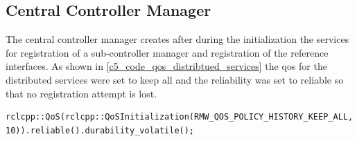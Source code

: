 \subsection{Central Controller Manager}
The central controller manager creates after during the initialization the services for registration of a sub-controller manager and registration of the reference interfaces. As shown in \autoref{c5_code_qos_distribtued_services} the \gls{qos} for the distributed services were set to keep all and the reliability was set to reliable so that no registration attempt is lost. 
\lstset{language=C++,basicstyle=\small}
\begin{lstlisting}[caption=\gls{qos} for central controller managers distributed services.,label=c5_code_qos_distribtued_services]
    rclcpp::QoS(rclcpp::QoSInitialization(RMW_QOS_POLICY_HISTORY_KEEP_ALL, 10)).reliable().durability_volatile();
\end{lstlisting}

